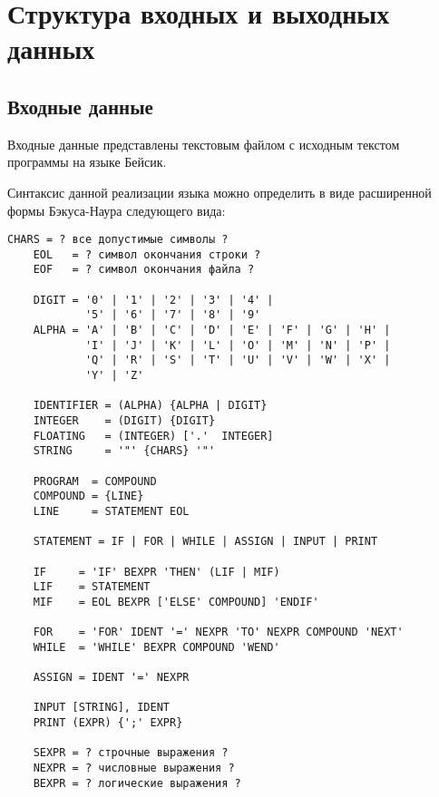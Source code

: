 \section{Структура входных и выходных данных}

\subsection{Входные данные}

Входные данные представлены текстовым файлом с исходным текстом программы на языке Бейсик.

Синтаксис данной реализации языка можно определить в виде расширенной формы Бэкуса-Наура
следующего вида:

\begin{Verbatim}[fontsize=\small]
    CHARS = ? все допустимые символы ?
    EOL   = ? символ окончания строки ?
    EOF   = ? символ окончания файла ?

    DIGIT = '0' | '1' | '2' | '3' | '4' | 
            '5' | '6' | '7' | '8' | '9'
    ALPHA = 'A' | 'B' | 'C' | 'D' | 'E' | 'F' | 'G' | 'H' | 
            'I' | 'J' | 'K' | 'L' | 'O' | 'M' | 'N' | 'P' | 
            'Q' | 'R' | 'S' | 'T' | 'U' | 'V' | 'W' | 'X' | 
            'Y' | 'Z'

    IDENTIFIER = (ALPHA) {ALPHA | DIGIT}
    INTEGER    = (DIGIT) {DIGIT}
    FLOATING   = (INTEGER) ['.'  INTEGER]
    STRING     = '"' {CHARS} '"' 

    PROGRAM  = COMPOUND
    COMPOUND = {LINE}
    LINE     = STATEMENT EOL
    
    STATEMENT = IF | FOR | WHILE | ASSIGN | INPUT | PRINT

    IF     = 'IF' BEXPR 'THEN' (LIF | MIF)
    LIF    = STATEMENT
    MIF    = EOL BEXPR ['ELSE' COMPOUND] 'ENDIF'

    FOR    = 'FOR' IDENT '=' NEXPR 'TO' NEXPR COMPOUND 'NEXT'
    WHILE  = 'WHILE' BEXPR COMPOUND 'WEND'

    ASSIGN = IDENT '=' NEXPR
    
    INPUT [STRING], IDENT
    PRINT (EXPR) {';' EXPR}
    
    SEXPR = ? строчные выражения ?
    NEXPR = ? числовные выражения ?
    BEXPR = ? логические выражения ?
\end{Verbatim}

